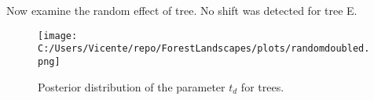 \documentclass{article}
\begin{document}
Now examine the random effect of tree.
No shift was detected for tree E.
\begin{figure}
    \centering
    \texttt{[image: C:/Users/Vicente/repo/ForestLandscapes/plots/randomdoubled.png]}
    \caption{Posterior distribution of the parameter $t_d$ for trees.}
    \label{fig:td_posterior_tree_fixed}
\end{figure}
\end{document}
